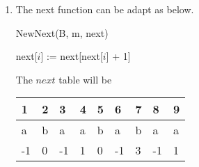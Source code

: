 \documentclass[a4paper,12pt]{article}
\begin{document}
\begin{enumerate}
{}

\item{ The next function can be adapt as below.
\begin{algorithm}
	\caption{NewNext(B, m, next)} 
	\begin{algorithmic}[1]
	            \State next[$i$] := next[next[$i$] + 1]
	        \EndIf
	    \EndFor
	\end{algorithmic} 
\end{algorithm}
\newpage
The $next$ table will be \\
\begin{center}
\begin{tabular}{ | m | m | m | m | m | m | m | m | m | } 
\hline
1 & 2 & 3 & 4 & 5 & 6 & 7 & 8 & 9 \\
\hline
a & b & a & a & b & a & b & a & a \\ 
\hline
-1 & 0 & -1 & 1 & 0 & -1 & 3 & -1 & 1 \\ 
\hline
\end{tabular}
\end{center}

}

\end{enumerate}
\end{document}
